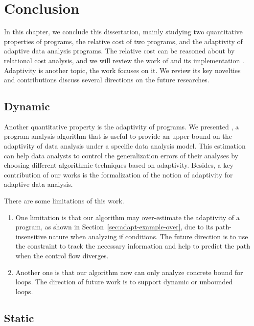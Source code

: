 \chapter{Conclusion}
\label{ch:conclusion}

In this chapter, we conclude this dissertation, mainly studying two quantitative properties of programs, the relative cost of two programs, and the adaptivity of adaptive data analysis programs. The relative cost can be reasoned about by relational cost analysis, and we will review the work of {\Arel} and its implementation {\BIAREL}. Adaptivity is another topic, the work {\ADAPTSYSTEM} focuses on it.  We
review its key novelties and contributions discuss several directions on the future researches. 


 
 \section{Dynamic}
 
 Another quantitative property is the adaptivity of programs. We presented {\ADAPTSYSTEM}, 
 a program analysis algorithm that is useful to provide an upper bound on the adaptivity of data analysis under a specific data analysis model. 
 This estimation can help data analysts to control the generalization errors of their analyses by choosing different algorithmic techniques based on adaptivity. 
 Besides, a key contribution of our works is the formalization of the notion of adaptivity for adaptive data analysis. 

 There are some limitations of this work. 
 \begin{enumerate}
     \item One limitation is that our algorithm may over-estimate the adaptivity of a program, 
     as shown in Section~\ref{sec:adapt-example-over}, due to its path-insensitive nature when analyzing if conditions. 
     The future direction is to use the constraint to track the necessary information and help to predict the path when the control flow diverges.
     \item Another one is that our algorithm now can only analyze concrete bound for loops. 
     The direction of future work is to support dynamic or unbounded loops. 
 \end{enumerate}
 
 \section{Static}
